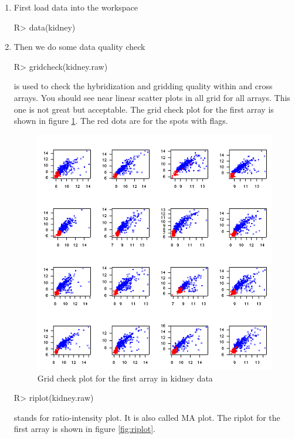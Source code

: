 \begin{enumerate}
\item First load data into the workspace
\begin{Sinput}
R> data(kidney)
\end{Sinput}
\item Then we do some data quality check
\begin{Sinput}
R> gridcheck(kidney.raw)
\end{Sinput}
 is used to check the hybridization 
and gridding quality within and
cross arrays. You should see near linear scatter 
plots in all grid for all arrays. 
This one is not great but acceptable. The grid check plot for the first array
is shown in figure \ref{fig:gridcheck}. The red dots are for the spots with flags.
\begin{figure}[htbp]
\centering
\includegraphics{gridcheck.png}
\caption{Grid check plot for the first array in kidney data}
\label{fig:gridcheck}
\end{figure}
\begin{Sinput}
R> riplot(kidney.raw)
\end{Sinput}
 stands for ratio-intensity plot. It is also called MA plot. 
The riplot for the first array is shown in figure \ref{fig:riplot}. 
\begin{figure}[htbp]
\centering

\end{figure}
\end{enumerate}
